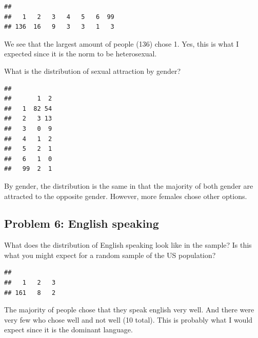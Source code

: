 \documentclass[
]{article}
\newenvironment{Shaded}{\begin{snugshade}}{\end{snugshade}}
\newcommand{\FunctionTok}[1]{\textcolor[rgb]{0.00,0.00,0.00}{#1}}
\newcommand{\NormalTok}[1]{#1}
\newcommand{\SpecialCharTok}[1]{\textcolor[rgb]{0.00,0.00,0.00}{#1}}
\begin{document}
\begin{verbatim}
## 
##   1   2   3   4   5   6  99 
## 136  16   9   3   3   1   3
\end{verbatim}

We see that the largest amount of people (136) chose 1. Yes, this is
what I expected since it is the norm to be heterosexual.

What is the distribution of sexual attraction by gender?

\begin{Shaded}
\end{Shaded}

\begin{verbatim}
##     
##       1  2
##   1  82 54
##   2   3 13
##   3   0  9
##   4   1  2
##   5   2  1
##   6   1  0
##   99  2  1
\end{verbatim}

By gender, the distribution is the same in that the majority of both
gender are attracted to the opposite gender. However, more females chose
other options.

\hypertarget{problem-6-english-speaking}{%
\subsection{Problem 6: English
speaking}\label{problem-6-english-speaking}}

What does the distribution of English speaking look like in the sample?
Is this what you might expect for a random sample of the US population?

\begin{Shaded}
\end{Shaded}

\begin{verbatim}
## 
##   1   2   3 
## 161   8   2
\end{verbatim}

The majority of people chose that they speak english very well. And
there were very few who chose well and not well (10 total). This is
probably what I would expect since it is the dominant language.
\end{document}
